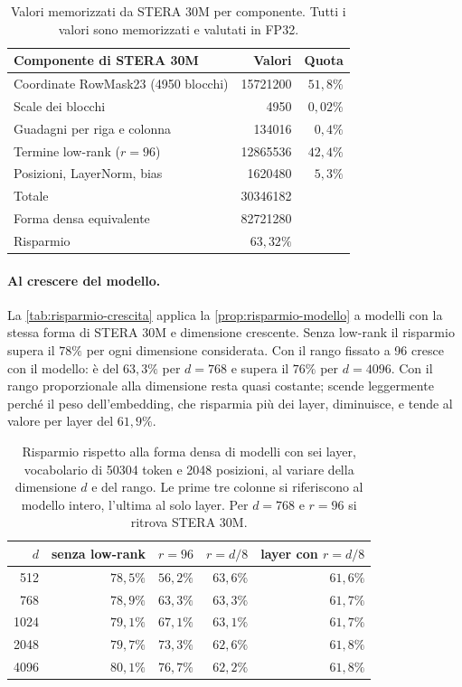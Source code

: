 \begin{table}[H]
\centering
\small
\begin{tabular}{lrr}
\toprule
Componente di STERA 30M & Valori & Quota \\
\midrule
Coordinate RowMask23 (\num{4950} blocchi) & \num{15721200} & $51{,}8\%$ \\
Scale dei blocchi & \num{4950} & $0{,}02\%$ \\
Guadagni per riga e colonna & \num{134016} & $0{,}4\%$ \\
Termine low-rank ($r=96$) & \num{12865536} & $42{,}4\%$ \\
Posizioni, LayerNorm, bias & \num{1620480} & $5{,}3\%$ \\
\midrule
Totale & \num{30346182} & \\
Forma densa equivalente & \num{82721280} & \\
Risparmio & $63{,}32\%$ & \\
\bottomrule
\end{tabular}
\caption{Valori memorizzati da STERA 30M per componente. Tutti i valori sono memorizzati e valutati in FP32.}
\label{tab:componenti-stera30m}
\end{table}

\paragraph{Al crescere del modello.} La \autoref{tab:risparmio-crescita} applica la \autoref{prop:risparmio-modello} a modelli con la stessa forma di STERA 30M e dimensione crescente. Senza low-rank il risparmio supera il $78\%$ per ogni dimensione considerata. Con il rango fissato a 96 cresce con il modello: è del $63{,}3\%$ per $d=768$ e supera il $76\%$ per $d=4096$. Con il rango proporzionale alla dimensione resta quasi costante; scende leggermente perché il peso dell'embedding, che risparmia più dei layer, diminuisce, e tende al valore per layer del $61{,}9\%$.

\begin{table}[H]
\centering
\small
\begin{tabular}{rrrrr}
\toprule
$d$ & senza low-rank & $r=96$ & $r=d/8$ & layer con $r=d/8$ \\
\midrule
512 & $78{,}5\%$ & $56{,}2\%$ & $63{,}6\%$ & $61{,}6\%$ \\
768 & $78{,}9\%$ & $63{,}3\%$ & $63{,}3\%$ & $61{,}7\%$ \\
1024 & $79{,}1\%$ & $67{,}1\%$ & $63{,}1\%$ & $61{,}7\%$ \\
2048 & $79{,}7\%$ & $73{,}3\%$ & $62{,}6\%$ & $61{,}8\%$ \\
4096 & $80{,}1\%$ & $76{,}7\%$ & $62{,}2\%$ & $61{,}8\%$ \\
\bottomrule
\end{tabular}
\caption{Risparmio rispetto alla forma densa di modelli con sei layer, vocabolario di \num{50304} token e \num{2048} posizioni, al variare della dimensione $d$ e del rango. Le prime tre colonne si riferiscono al modello intero, l'ultima al solo layer. Per $d=768$ e $r=96$ si ritrova STERA 30M.}
\label{tab:risparmio-crescita}
\end{table}

